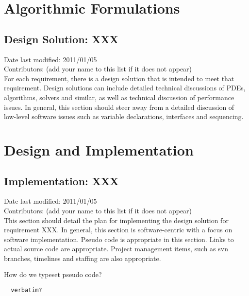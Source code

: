 \documentclass[11pt]{report}
\begin{document}

\chapter{Algorithmic Formulations}

\section{Design Solution: XXX}
Date last modified: 2011/01/05 \\
Contributors: (add your name to this list if it does not appear) \\

For each requirement, there is a design solution that is intended to meet that requirement. Design solutions can include detailed technical discussions of PDEs, algorithms, solvers and similar, as well as technical discussion of performance issues. In general, this section should steer away from a detailed discussion of low-level software issues such as variable declarations, interfaces and sequencing.



\chapter{Design and Implementation}

\section{Implementation: XXX}
Date last modified: 2011/01/05 \\
Contributors: (add your name to this list if it does not appear) \\

This section should detail the plan for implementing the design solution for requirement XXX. In general, this section is software-centric with a focus on software implementation. Pseudo code is appropriate in this section. Links to actual source code are appropriate. Project management items, such as svn branches, timelines and staffing are also appropriate.

How do we typeset pseudo code? 
\begin{verbatim}
  verbatim?
\end{verbatim}

\end{document}
